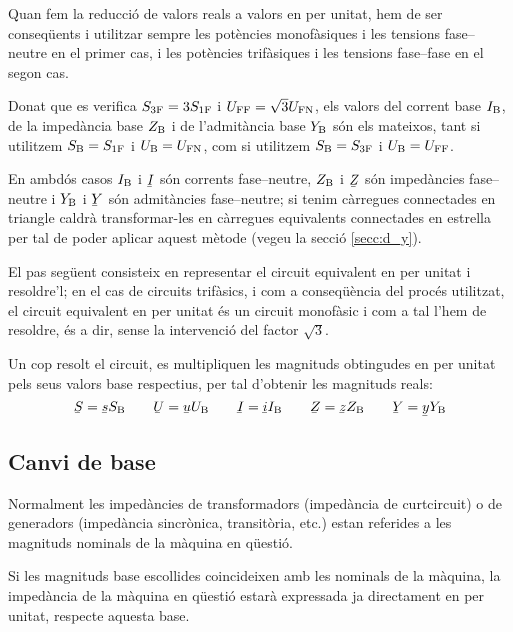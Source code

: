  Quan fem la reducció de valors reals a valors en per unitat, hem de ser conseqüents i utilitzar sempre les potències monofàsiques i les tensions fase--neutre en el primer cas, i les potències trifàsiques i les tensions fase--fase en el segon cas.

 Donat que es verifica $S_\mathrm{3F}=3 S_\mathrm{1F}$ i $U_\mathrm{FF}=\sqrt{3}U_\mathrm{FN}$, els valors  del corrent base $I_\mathrm{B}$, de la impedància base $Z_\mathrm{B}$ i  de l'admitància base $Y_\mathrm{B}$ són els mateixos, tant si utilitzem $S_\mathrm{B}=S_\mathrm{1F}$ i $U_\mathrm{B}=U_\mathrm{FN}$, com si utilitzem $S_\mathrm{B}=S_\mathrm{3F}$ i $U_\mathrm{B}=U_\mathrm{FF}$.

 En ambdós casos $I_\mathrm{B}$ i $\cmplx{I}$ són corrents fase--neutre, $Z_\mathrm{B}$ i $\cmplx{Z}$ són impedàncies fase--neutre i $Y_\mathrm{B}$ i $\cmplx{Y}$ són admitàncies fase--neutre; si tenim càrregues connectades en triangle caldrà transformar-les en càrregues equivalents connectades en estrella per tal de poder aplicar aquest mètode (vegeu la secció \ref{secc:d_y}).

El pas següent consisteix en representar el circuit equivalent en
per unitat i resoldre'l; en el cas de circuits trifàsics, i com a conseqüència del procés utilitzat, el circuit equivalent en per unitat és un circuit monofàsic i com a tal l'hem de resoldre, és a dir, sense la intervenció del factor $\sqrt{3}$.

Un cop resolt el circuit, es multipliquen les magnituds obtingudes en per unitat pels
seus valors base respectius, per tal d'obtenir les magnituds reals:
\begin{equation}
   \cmplx{S} = \cmplx{s} S\ped{B} \qquad \cmplx{U} = \cmplx{u} U\ped{B} \qquad \cmplx{I} = \cmplx{i} I\ped{B} \qquad \cmplx{Z} = \cmplx{z} Z\ped{B} \qquad \cmplx{Y} = \cmplx{y} Y\ped{B}
\end{equation}

\subsection{Canvi de base}\label{sec:canvi-base} 

Normalment les impedàncies de transformadors (impedància de curtcircuit) o de generadors (impedància sincrònica, transitòria, etc.) estan referides a les magnituds nominals de la màquina en qüestió.


Si les magnituds base escollides coincideixen amb les nominals de la màquina,
la impedància de la màquina en qüestió estarà expressada ja directament en per unitat, respecte aquesta base.

